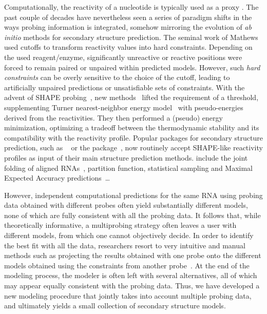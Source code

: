 \documentclass[a4,center,fleqn]{NAR}
\begin{document}
\enlargethispage{-50.1pt}


Computationally, the reactivity of a nucleotide is typically used as a proxy . The past couple of decades have nevertheless seen a series of paradigm shifts in the ways probing information is integrated, somehow mirroring the evolution of {\em ab initio} methods for secondary structure prediction. The seminal work of Mathews~\cite{Mathews2004} used cutoffs to transform reactivity values into hard constraints. Depending on the used reagent/enzyme, significantly unreactive or reactive positions were forced to remain paired or  unpaired within predicted models. However, such \emph{hard constraints} can be overly  sensitive to the choice of the cutoff, leading to artificially unpaired predictions or unsatisfiable sets of constraints. With the advent of SHAPE probing~\cite{Smola2015}, new methods~\cite{Deigan2009,Zarringhalam2012,Washietl2012} lifted the requirement of a threshold, supplementing  Turner nearest-neighbor energy model~\cite{Turner2010} with pseudo-energies derived from the reactivities. They  then performed a (pseudo) energy minimization, optimizing a tradeoff between the thermodynamic stability and its compatibility with the reactivity profile. Popular packages for secondary structure prediction, such as ~\cite{Mathews2004} or the  package~\cite{Lorenz2011}, now routinely accept SHAPE-like reactivity profiles as input of their main structure prediction methods.  include the joint folding of aligned RNAs~\cite{Lavender2015}, partition function, statistical sampling and Maximal Expected Accuracy predictions~\cite{Spasic2017}\ldots 


However, independent computational predictions for the same RNA using probing data obtained with different probes often yield substantially different models, none of which are fully consistent with all the probing data. 
It follows that, while theoretically informative, a multiprobing strategy often leaves a user with different models, from which one cannot objectively decide. In order to identify the best fit with all the data, researchers resort to very intuitive and manual methods such as projecting the results obtained with one probe onto the different models obtained using the constraints from another probe~\cite{Herbreteau2005,James2008,Weill2004}. At the end of the modeling process, the modeler is often left with several alternatives, all of which may appear equally consistent with the probing data. Thus, we have developed a new modeling procedure that jointly takes into account multiple probing data, and ultimately yields a small collection of secondary structure models.
\end{document}
